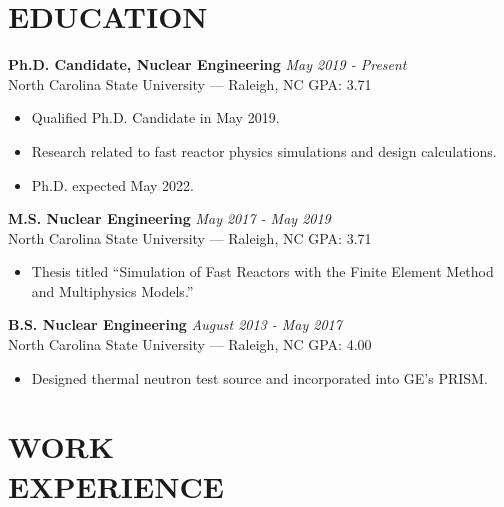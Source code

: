 \documentclass[margin, 10pt]{res}
\newcommand{\backwardspace}{-8pt}
\begin{document}
\begin{resume}


\vspace{-12pt}
 
\section{EDUCATION}  
\textbf{Ph.D. Candidate, Nuclear Engineering} \hfill 
  \textit{May 2019 - Present}\\
North Carolina State University --- Raleigh, NC \hfill GPA: 3.71
\begin{itemize}
    \item Qualified Ph.D. Candidate in May 2019.
    \item Research related to fast reactor physics simulations and design calculations.
    \item Ph.D. expected May 2022.
\end{itemize}
\vspace{\backwardspace}
\textbf{M.S. Nuclear Engineering} \hfill \textit{May 2017 - May 2019} \\
North Carolina State University --- Raleigh, NC \hfill GPA: 3.71
\begin{itemize}
  \item Thesis titled ``Simulation of Fast Reactors with the Finite Element Method and Multiphysics Models.''
\end{itemize}
\vspace{\backwardspace}
\textbf{B.S. Nuclear Engineering} \hfill \textit{August 2013 - May 2017} \\
North Carolina State University --- Raleigh, NC \hfill GPA: 4.00
\begin{itemize}
    \item Designed thermal neutron test source and incorporated into GE's PRISM.
\end{itemize}

 
\section{WORK \\ EXPERIENCE}


\end{resume}
\end{document}
